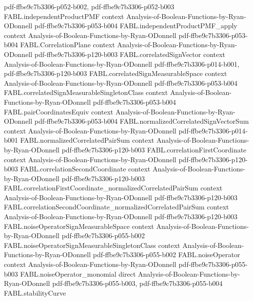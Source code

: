 \begin{theorem}
  {pdf-ffbe9c7b3306-p052-b002,
    pdf-ffbe9c7b3306-p052-b003}
\proofstep
  {FABL.independentProductPMF}
  {context}
  {Analysis-of-Boolean-Functions-by-Ryan-ODonnell}
  {pdf-ffbe9c7b3306-p053-b004}
\proofstep
  {FABL.independentProductPMF_apply}
  {context}
  {Analysis-of-Boolean-Functions-by-Ryan-ODonnell}
  {pdf-ffbe9c7b3306-p053-b004}
\proofstep
  {FABL.CorrelationPlane}
  {context}
  {Analysis-of-Boolean-Functions-by-Ryan-ODonnell}
  {pdf-ffbe9c7b3306-p120-b003}
\proofstep
  {FABL.correlatedSignVector}
  {context}
  {Analysis-of-Boolean-Functions-by-Ryan-ODonnell}
  {pdf-ffbe9c7b3306-p014-b001,
    pdf-ffbe9c7b3306-p120-b003}
\proofstep
  {FABL.correlatedSignMeasurableSpace}
  {context}
  {Analysis-of-Boolean-Functions-by-Ryan-ODonnell}
  {pdf-ffbe9c7b3306-p053-b004}
\proofstep
  {FABL.correlatedSignMeasurableSingletonClass}
  {context}
  {Analysis-of-Boolean-Functions-by-Ryan-ODonnell}
  {pdf-ffbe9c7b3306-p053-b004}
\proofstep
  {FABL.pairCoordinatesEquiv}
  {context}
  {Analysis-of-Boolean-Functions-by-Ryan-ODonnell}
  {pdf-ffbe9c7b3306-p053-b004}
\proofstep
  {FABL.normalizedCorrelatedSignVectorSum}
  {context}
  {Analysis-of-Boolean-Functions-by-Ryan-ODonnell}
  {pdf-ffbe9c7b3306-p014-b001}
\proofstep
  {FABL.normalizedCorrelatedPairSum}
  {context}
  {Analysis-of-Boolean-Functions-by-Ryan-ODonnell}
  {pdf-ffbe9c7b3306-p120-b003}
\proofstep
  {FABL.correlationFirstCoordinate}
  {context}
  {Analysis-of-Boolean-Functions-by-Ryan-ODonnell}
  {pdf-ffbe9c7b3306-p120-b003}
\proofstep
  {FABL.correlationSecondCoordinate}
  {context}
  {Analysis-of-Boolean-Functions-by-Ryan-ODonnell}
  {pdf-ffbe9c7b3306-p120-b003}
\proofstep
  {FABL.correlationFirstCoordinate_normalizedCorrelatedPairSum}
  {context}
  {Analysis-of-Boolean-Functions-by-Ryan-ODonnell}
  {pdf-ffbe9c7b3306-p120-b003}
\proofstep
  {FABL.correlationSecondCoordinate_normalizedCorrelatedPairSum}
  {context}
  {Analysis-of-Boolean-Functions-by-Ryan-ODonnell}
  {pdf-ffbe9c7b3306-p120-b003}
\proofstep
  {FABL.noiseOperatorSignMeasurableSpace}
  {context}
  {Analysis-of-Boolean-Functions-by-Ryan-ODonnell}
  {pdf-ffbe9c7b3306-p055-b002}
\proofstep
  {FABL.noiseOperatorSignMeasurableSingletonClass}
  {context}
  {Analysis-of-Boolean-Functions-by-Ryan-ODonnell}
  {pdf-ffbe9c7b3306-p055-b002}
\proofstep
  {FABL.noiseOperator}
  {context}
  {Analysis-of-Boolean-Functions-by-Ryan-ODonnell}
  {pdf-ffbe9c7b3306-p055-b003}
\proofstep
  {FABL.noiseOperator_monomial}
  {direct}
  {Analysis-of-Boolean-Functions-by-Ryan-ODonnell}
  {pdf-ffbe9c7b3306-p055-b003,
    pdf-ffbe9c7b3306-p055-b004}
\proofstep
  {FABL.stabilityCurve}

\end{theorem}

